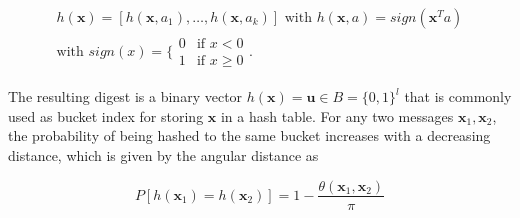 \begin{align*}
    h(\bm{x}) = [h(\bm{x}, a_1), \dots, h(\bm{x}, a_k)] \text{ with } h(\bm{x}, a) = sign(\bm{x}^Ta) \\
    \text{with } sign(x) = \Biggl\{ \begin{array}{lc}
        0 & \text{if } x < 0 \\
        1 & \text{if } x \geq 0
    \end{array}.
\end{align*}

The resulting digest is a binary vector $h(\bm{x}) = \bm{u} \in B = \{0, 1\}^l$ that is commonly used as bucket index for storing $\bm{x}$ in a hash table. For any two messages $\bm{x}_1, \bm{x}_2$, the probability of being hashed to the same bucket increases with a decreasing distance, which is given by the angular distance as

\begin{equation}\label{eq:rp_proba}
    P[h(\bm{x}_1) = h(\bm{x}_2)] = 1 - \frac{\theta(\bm{x}_1, \bm{x}_2)}{\pi}
\end{equation}

